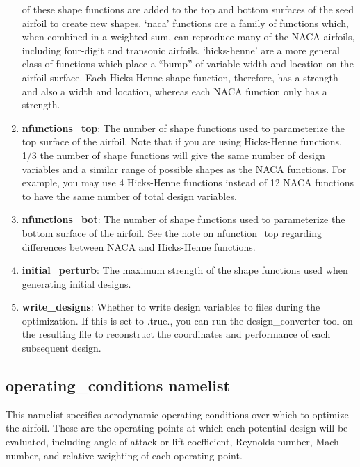 \documentclass[11pt]{article}
\begin{document}
\begin{enumerate}
{of these shape functions are added to the top and bottom surfaces of the seed airfoil to
create new shapes.  `naca' functions are a family of functions which, when combined in a
weighted sum, can reproduce many of the NACA airfoils, including four-digit and transonic
airfoils.  `hicks-henne' are a more general class of functions which place a ``bump'' of
variable width and location on the airfoil surface.  Each Hicks-Henne shape function,
therefore, has a strength and also a width and location, whereas each NACA function only
has a strength.}
\item{\textbf{nfunctions\_top}: The number of shape functions used to parameterize the top
surface of the airfoil.  Note that if you are using Hicks-Henne functions, 1/3 the
number of shape functions will give the same number of design variables and a similar range of
possible shapes as the NACA functions.  For example, you may use 4 Hicks-Henne functions
instead of 12 NACA functions to have the same number of total design variables.}
\item{\textbf{nfunctions\_bot}: The number of shape functions used to parameterize the
bottom surface of the airfoil.  See the note on nfunction\_top regarding differences
between NACA and Hicks-Henne functions.}
\item{\textbf{initial\_perturb}: The maximum strength of the shape functions used when
generating initial designs.}
\item{\textbf{write\_designs}: Whether to write design variables to files during the
optimization.  If this is set to .true., you can run the design\_converter tool on the
resulting file to reconstruct the coordinates and performance of each subsequent design.}
\end{enumerate}

\subsection{operating\_conditions namelist}

This namelist specifies aerodynamic operating conditions over which to optimize the
airfoil.  These are the operating points at which each potential design will be evaluated,
including angle of attack or lift coefficient, Reynolds number, Mach number, and
relative weighting of each operating point.
\end{document}
